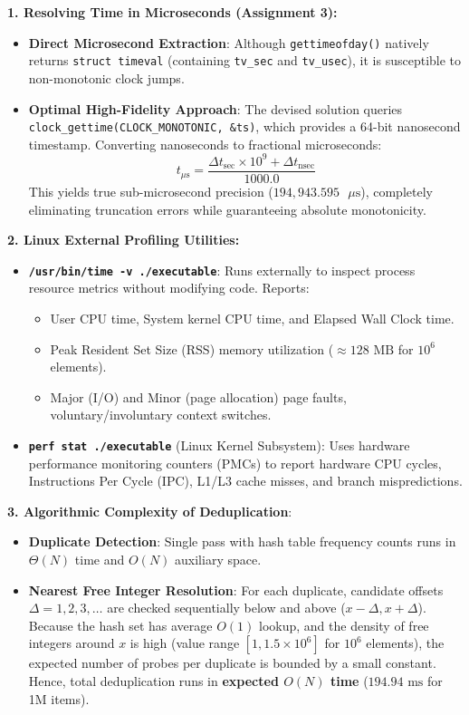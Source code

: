 \documentclass[12pt]{article}
\begin{document}
\textbf{1. Resolving Time in Microseconds (Assignment 3):}
\begin{itemize}
    \item \textbf{Direct Microsecond Extraction}: Although \texttt{gettimeofday()} natively returns \texttt{struct timeval} (containing \texttt{tv\_sec} and \texttt{tv\_usec}), it is susceptible to non-monotonic clock jumps.
    \item \textbf{Optimal High-Fidelity Approach}: The devised solution queries \texttt{clock\_gettime(CLOCK\_MONOTONIC, \&ts)}, which provides a 64-bit nanosecond timestamp. Converting nanoseconds to fractional microseconds:
    \[
    t_{\mu\text{s}} = \frac{\Delta t_{\text{sec}} \times 10^9 + \Delta t_{\text{nsec}}}{1000.0}
    \]
    This yields true sub-microsecond precision ($194,943.595\text{ }\mu\text{s}$), completely eliminating truncation errors while guaranteeing absolute monotonicity.
\end{itemize}

\textbf{2. Linux External Profiling Utilities:}
\begin{itemize}
    \item \textbf{\texttt{/usr/bin/time -v ./executable}}: Runs externally to inspect process resource metrics without modifying code. Reports:
    \begin{itemize}
        \item User CPU time, System kernel CPU time, and Elapsed Wall Clock time.
        \item Peak Resident Set Size (RSS) memory utilization ($\approx 128\text{ MB}$ for $10^6$ elements).
        \item Major (I/O) and Minor (page allocation) page faults, voluntary/involuntary context switches.
    \end{itemize}
    \item \textbf{\texttt{perf stat ./executable}} (Linux Kernel Subsystem): Uses hardware performance monitoring counters (PMCs) to report hardware CPU cycles, Instructions Per Cycle (IPC), L1/L3 cache misses, and branch mispredictions.
\end{itemize}

\textbf{3. Algorithmic Complexity of Deduplication}:
\begin{itemize}
    \item \textbf{Duplicate Detection}: Single pass with hash table frequency counts runs in $\Theta(N)$ time and $O(N)$ auxiliary space.
    \item \textbf{Nearest Free Integer Resolution}: For each duplicate, candidate offsets $\Delta = 1, 2, 3, \dots$ are checked sequentially below and above ($x - \Delta, x + \Delta$). Because the hash set has average $O(1)$ lookup, and the density of free integers around $x$ is high (value range $[1, 1.5 \times 10^6]$ for $10^6$ elements), the expected number of probes per duplicate is bounded by a small constant. Hence, total deduplication runs in \textbf{expected $O(N)$ time} ($194.94\text{ ms}$ for 1M items).
\end{itemize}
\end{document}
